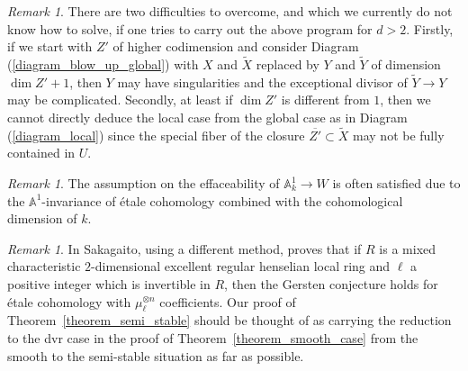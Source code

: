 \documentclass[10pt,a4paper]{article}
\numberwithin{equation}{section}
\newtheorem{Key lemma}[theorem]{Key lemma}
\theoremstyle{definition}
\theoremstyle{remark}
\newtheorem{remark}[theorem]{Remark}
\newcommand{\bb}{\mathbb}
\renewcommand{\tilde}{\widetilde}
\begin{document}
\begin{remark}
There are two difficulties to overcome, and which we currently do not know how to solve, if one tries to carry out the above program for $d>2$. Firstly, if we start with $Z'$ of higher codimension and consider Diagram (\ref{diagram_blow_up_global}) with $X$ and $\tilde X$ replaced by $Y$ and $\tilde Y$ of dimension $\dim Z'+1$, then $Y$ may have singularities and the exceptional divisor of $\tilde{Y}\to Y$ may be complicated. Secondly, at least if $\dim Z'$ is different from $1$, then we cannot directly deduce the local case from the global case as in Diagram (\ref{diagram_local}) since the special fiber of the closure $\overline{Z'}\subset \tilde{X}$ may not be fully contained in $U$.
\end{remark}

\begin{remark}
The assumption on the effaceability of $\bb A^1_k\to W$ is often satisfied due to the $\bb A^1$-invariance of \'etale cohomology combined with the cohomological dimension of $k$.
\end{remark}

\begin{remark}
In \cite[Theorem 9]{Sakagaito2020} Sakagaito, using a different method, proves that if $R$ is a mixed characteristic $2$-dimensional excellent regular henselian local ring and $\ell$ a positive integer which  is invertible in $R$, then the Gersten conjecture holds for \'etale cohomology with $\mu_\ell^{\otimes n}$ coefficients. Our proof of Theorem~\ref{theorem_semi_stable} should be thought of as carrying the reduction to the dvr case in the proof of Theorem~\ref{theorem_smooth_case} from the smooth to the semi-stable situation as far as possible. 
\end{remark}

\newcommand{\etalchar}[1]{$^{#1}$}
\end{document}
